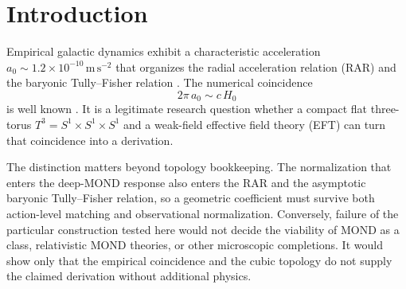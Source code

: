 \documentclass[aps,prd,reprint,superscriptaddress,nofootinbib,floatfix,showkeys]{revtex4-2}
\newcommand{\Tthree}{T^{3}}
\newcommand{\azero}{a_{0}}
\newcommand{\Hzero}{H_{0}}
\begin{document}

\maketitle

\section{Introduction}
\label{sec:intro}

Empirical galactic dynamics exhibit a characteristic acceleration
\(\azero\sim 1.2\times 10^{-10}\,\mathrm{m\,s^{-2}}\) that organizes the
radial acceleration relation (RAR) and the baryonic Tully--Fisher relation
\cite{mond,famaey_mcgaugh,mcgaugh_rar,lelli_rar}.
The numerical coincidence
\begin{equation}
  2\pi\,\azero \sim c\,\Hzero
  \label{eq:coincidence}
\end{equation}
is well known \cite{mond,famaey_mcgaugh}.  It is a legitimate research question
whether a compact flat three-torus \(\Tthree=S^{1}\times S^{1}\times S^{1}\)
\cite{lachieze_rey_luminet,planck_topology} and a weak-field effective field
theory (EFT) can turn that coincidence into a derivation.

The distinction matters beyond topology bookkeeping.  The normalization that
enters the deep-MOND response also enters the RAR and the asymptotic baryonic
Tully--Fisher relation, so a geometric coefficient must survive both
action-level matching and observational normalization.  Conversely, failure
of the particular construction tested here would not decide the viability of
MOND as a class, relativistic MOND theories, or other microscopic completions.
It would show only that the empirical coincidence and the cubic topology do
not supply the claimed derivation without additional physics.
\end{document}
